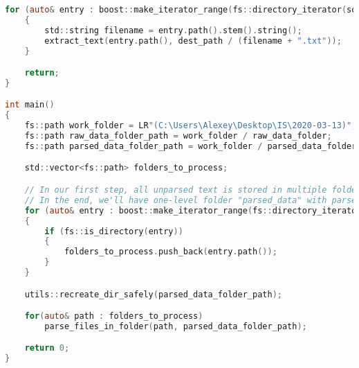 \begin{lstlisting}[language=C]
	for (auto& entry : boost::make_iterator_range(fs::directory_iterator(source_path), {}))
	{
		std::string filename = entry.path().stem().string();
		extract_text(entry.path(), dest_path / (filename + ".txt"));
	}

	return;
}

int main()
{
	fs::path work_folder = LR"(C:\Users\Alexey\Desktop\IS\2020-03-13)";
	fs::path raw_data_folder_path = work_folder / raw_data_folder;
	fs::path parsed_data_folder_path = work_folder / parsed_data_folder;

	std::vector<fs::path> folders_to_process;

	// In our first step, all unparsed text is stored in multiple folders
	// In the end, we'll have one-level folder "parsed_data" with parsed documents
	for (auto& entry : boost::make_iterator_range(fs::directory_iterator(raw_data_folder_path), {}))
	{
		if (fs::is_directory(entry))
		{
			folders_to_process.push_back(entry.path());
		}
	}

	utils::recreate_dir_safely(parsed_data_folder_path);

	for(auto& path : folders_to_process)
		parse_files_in_folder(path, parsed_data_folder_path);

	return 0;
}


\end{lstlisting}

\pagebreak

